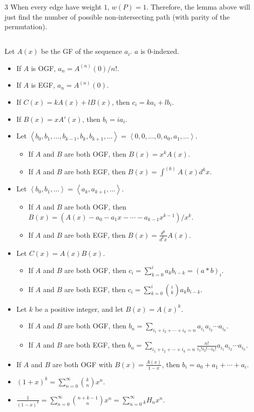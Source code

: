 \documentclass[landscape, 8pt, a4paper, oneside]{extarticle}
\begin{document}
\begin{multicols*}{3}
When every edge have weight $1$, $w(P) = 1$. Therefore, the lemma above will just find the number of possible non-intersecting path (with parity of the permutation).
\subsection{}
Let $A(x)$ be the GF of the sequence $a_i$. $a$ is $0$-indexed.
\begin{itemize}
	\item If $A$ is OGF, $a_n = A^{(n)}(0)/n!$.
	\item If $A$ is EGF, $a_n = A^{(n)}(0)$.
	\item If $C(x) = k A(x) + l B(x)$, then $c_i = k a_i + l b_i$.
	\item If $B(x) = x A'(x)$, then $b_i = i a_i$.
	\item Let $\left< b_0, b_1, \ldots, b_{k-1}, b_k, b_{k+1}, \ldots \right> = \left< 0, 0, \ldots, 0, a_0, a_1, \ldots \right>$.
	\begin{itemize}
		\item If $A$ and $B$ are both OGF, then $B(x) = x^k A(x)$.
		\item If $A$ and $B$ are both EGF, then $B(x) = \int^{(k)} A(x) d^kx$.
	\end{itemize}
	\item Let $\left< b_0, b_1, \ldots \right> = \left< a_k, a_{k+1}, \ldots \right>$.
	\begin{itemize}
		\item If $A$ and $B$ are both OGF, then $B(x) = (A(x) - a_0 - a_1 x - \cdots - a_{k-1} x^{k-1})/x^k$.
		\item If $A$ and $B$ are both EGF, then $B(x) = \frac{d^k}{d^kx} A(x)$.
	\end{itemize}
	\item Let $C(x) = A(x) B(x)$.
	\begin{itemize}
		\item If $A$ and $B$ are both OGF, then $c_i = \sum_{k=0}^{i} a_k b_{i-k} = (a*b)_i$.
		\item If $A$ and $B$ are both EGF, then $c_i = \sum_{k=0}^{i} \binom{i}{k} a_k b_{i-k}$.
	\end{itemize}
	\item Let $k$ be a positive integer, and let $B(x) = A(x)^k$.
	\begin{itemize}
		\item If $A$ and $B$ are both OGF, then $b_n = \sum_{i_1 + i_2 + \cdots + i_k = n} a_{i_1} a_{i_2} \cdots a_{i_k}$.
		\item If $A$ and $B$ are both EGF, then $b_n = \sum_{i_1 + i_2 + \cdots + i_k = n} \frac{n!}{i_1! i_2! \cdots i_k!} a_{i_1} a_{i_2} \cdots a_{i_k}$.
	\end{itemize}
	\item If $A$ and $B$ are both OGF with $B(x) = \frac{A(x)}{1-x}$, then $b_i = a_0 + a_1 + \cdots + a_i$.
	\item $(1+x)^k = \sum_{n=0}^{\infty} \binom{k}{n} x^n$.
	\item $\frac{1}{(1-x)^k} = \sum_{n=0}^{\infty} \binom{n+k-1}{n} x^n = \sum_{n=0}^{\infty} {}_{k}H_{n} x^n$.
\end{itemize}

\end{multicols*}
\end{document}
